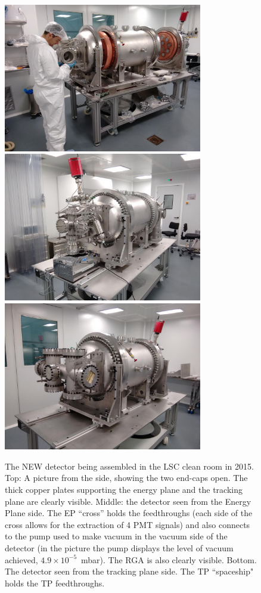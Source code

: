 \begin{figure}[hpt!]
\centering
\includegraphics[height=6.5cm]{img2/NewInCRWIthAlberto.png}
\includegraphics[height=6.5cm]{img2/NewSeenFromEP.png}
\includegraphics[height=6.5cm]{img2/NewSeenFromTP.png}

\caption{The NEW detector being assembled in the LSC clean room in 2015. Top: A picture from the side, showing the two end-caps open. The thick copper plates supporting the energy plane and the tracking plane are clearly visible. Middle: the detector seen from the Energy Plane side. The EP ``cross'' holds the feedthroughs (each side of the cross allows for the extraction of 4 PMT signals) and also connects to the pump used to make vacuum in the vacuum side of the detector (in the picture the pump displays the level of vacuum achieved, $4.9 \times 10^{-5}$~mbar). The RGA is also clearly visible. Bottom. The detector seen from the tracking plane side. The TP ``spaceship" holds the TP feedthroughs.} \label{fig.New}
\end{figure}

